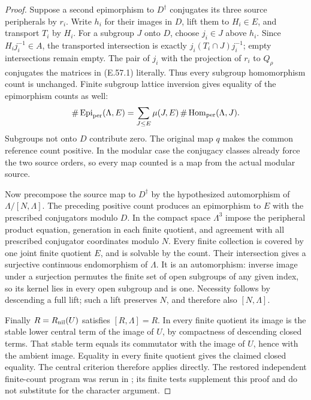 \begin{proof}
Suppose a second epimorphism to \(D^\dagger\) conjugates its three
source peripherals by \(r_i\). Write \(h_i\) for their images in
\(D\), lift them to \(H_i\in E\), and transport \(T_i\) by
\(H_i\). For a subgroup \(J\) onto \(D\), choose \(j_i\in J\)
above \(h_i\). Since \(H_ij_i^{-1}\in A\), the transported
intersection is exactly
\(j_i(T_i\cap J)j_i^{-1}\); empty intersections remain empty.
The pair of \(j_i\) with the projection of \(r_i\) to
\(Q_\rho\) conjugates the matrices in (E.57.1) literally.
Thus every subgroup homomorphism count is unchanged. Finite subgroup
lattice inversion gives equality of the epimorphism counts as well:
\[
 \#\operatorname{Epi}_{\rm per}(\Lambda,E)
       =\sum_{J\le E}\mu(J,E)\,
          \#\operatorname{Hom}_{\rm per}(\Lambda,J).
\]
Subgroups not onto \(D\) contribute zero. The original map \(q\)
makes the common reference count positive. In the modular case the
conjugacy classes already force the two source orders, so every map
counted is a map from the actual modular source.

Now precompose the source map to \(D^\dagger\) by the hypothesized
automorphism of \(\Lambda/[N,\Lambda]\). The preceding positive
count produces an epimorphism to \(E\) with the prescribed
conjugators modulo \(D\). In the compact space \(\Lambda^3\)
impose the peripheral product equation, generation in each finite
quotient, and agreement with all prescribed conjugator coordinates
modulo \(N\). Every finite collection is covered by one joint finite
quotient \(E\), and is solvable by the count. Their intersection
gives a surjective continuous endomorphism of \(\Lambda\).
It is an automorphism: inverse image under a surjection permutes the
finite set of open subgroups of any given index, so its kernel lies
in every open subgroup and is one. Necessity follows by descending
a full lift; such a lift preserves \(N\), and therefore also
\([N,\Lambda]\).

Finally \(R=R_{\rm nil}(U)\) satisfies \([R,\Lambda]=R\).
In every finite quotient its image is the stable lower central term
of the image of \(U\), by compactness of descending closed terms.
That stable term equals its commutator with the image of \(U\),
hence with the ambient image. Equality in every finite quotient gives
the claimed closed equality. The central criterion therefore applies
directly. The restored independent finite-count program was rerun in
; its finite tests supplement
this proof and do not substitute for the character argument.
\end{proof}

